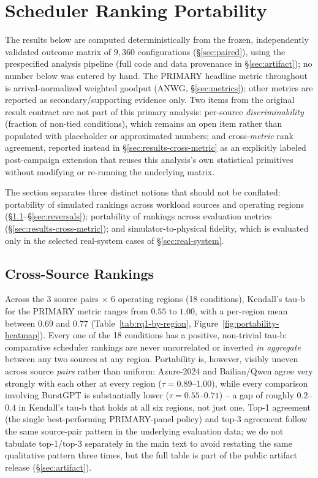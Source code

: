 \section{Scheduler Ranking Portability}
\label{sec:results}

The results below are computed deterministically from the frozen,
independently validated outcome matrix of $9{,}360$ configurations
(\S\ref{sec:paired}), using the prespecified analysis pipeline (full code
and data provenance in \S\ref{sec:artifact}); no number below was entered
by hand. The PRIMARY headline metric throughout is arrival-normalized
weighted goodput (ANWG, \S\ref{sec:metrics}); other metrics are reported
as secondary/supporting evidence only. Two items from the original result
contract are not part of this primary analysis: per-source
\emph{discriminability} (fraction of non-tied conditions), which remains
an open item rather than populated with placeholder or approximated
numbers; and cross-\emph{metric} rank agreement, reported instead in
\S\ref{sec:results-cross-metric} as an explicitly labeled post-campaign
extension that reuses this analysis's own statistical primitives without
modifying or re-running the underlying matrix.

The section separates three distinct notions that should not be conflated:
portability of simulated rankings across workload sources and operating
regions (\S\ref{sec:cross-source-rankings}--\S\ref{sec:reversals});
portability of rankings across evaluation metrics
(\S\ref{sec:results-cross-metric}); and simulator-to-physical fidelity,
which is evaluated only in the selected real-system cases of
\S\ref{sec:real-system}.

\subsection{Cross-Source Rankings}
\label{sec:cross-source-rankings}

Across the 3 source pairs $\times$ 6 operating regions (18 conditions),
Kendall's tau-b for the PRIMARY metric ranges from $0.55$ to $1.00$, with a
per-region mean between $0.69$ and $0.77$ (Table~\ref{tab:rq1-by-region},
Figure~\ref{fig:portability-heatmap}). Every one of the 18 conditions has a
positive, non-trivial tau-b: comparative scheduler rankings are never
uncorrelated or inverted \emph{in aggregate} between any two sources at any
region. Portability is, however, visibly uneven across source \emph{pairs}
rather than uniform: Azure-2024 and Bailian/Qwen agree very strongly with
each other at every region ($\tau = 0.89$--$1.00$), while every
comparison involving BurstGPT is substantially lower ($\tau =
0.55$--$0.71$) -- a gap of roughly $0.2$--$0.4$ in Kendall's tau-b that
holds at all six regions, not just one. Top-1 agreement (the single
best-performing PRIMARY-panel policy) and top-3 agreement follow the same
source-pair pattern in the underlying evaluation data; we do not
tabulate top-1/top-3 separately in the main text to avoid restating the
same qualitative pattern three times, but the full table is part of the
public artifact release (\S\ref{sec:artifact}).

